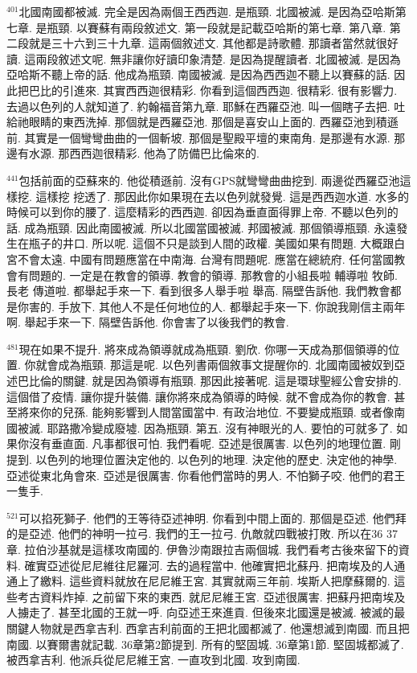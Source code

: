 \documentclass{book}
\begin{document}
$^{401}$北國南國都被滅.
完全是因為兩個王西西迦.
是瓶頸.
北國被滅.
是因為亞哈斯第七章.
是瓶頸.
以賽蘇有兩段敘述文.
第一段就是記載亞哈斯的第七章.
第八章.
第二段就是三十六到三十九章.
這兩個敘述文.
其他都是詩歌體.
那讀者當然就很好讀.
這兩段敘述文呢.
無非讓你好讀印象清楚.
是因為提醒讀者.
北國被滅.
是因為亞哈斯不聽上帝的話.
他成為瓶頸.
南國被滅.
是因為西西迦不聽上以賽蘇的話.
因此把巴比的引進來.
其實西西迦很精彩.
你看到這個西西迦.
很精彩.
很有影響力.
去過以色列的人就知道了.
約翰福音第九章.
耶穌在西羅亞池.
叫一個瞎子去把.
吐給祂眼睛的東西洗掉.
那個就是西羅亞池.
那個是喜安山上面的.
西羅亞池到積遜前.
其實是一個彎彎曲曲的一個斬坡.
那個是聖殿平壇的東南角.
是那邊有水源.
那邊有水源.
那西西迦很精彩.
他為了防備巴比倫來的.

$^{441}$包括前面的亞蘇來的.
他從積遜前.
沒有GPS就彎彎曲曲挖到.
兩邊從西羅亞池這樣挖.
這樣挖 挖透了.
那因此你如果現在去以色列就發覺.
這是西西迦水道.
水多的時候可以到你的腰了.
這麼精彩的西西迦.
卻因為垂直面得罪上帝.
不聽以色列的話.
成為瓶頸.
因此南國被滅.
所以北國當國被滅.
邦國被滅.
那個領導瓶頸.
永遠發生在瓶子的井口.
所以呢.
這個不只是談到人間的政權.
美國如果有問題.
大概跟白宮不會太遠.
中國有問題應當在中南海.
台灣有問題呢.
應當在總統府.
任何當國教會有問題的.
一定是在教會的領導.
教會的領導.
那教會的小組長啦 輔導啦 牧師.
長老 傳道啦.
都舉起手來一下.
看到很多人舉手啦 舉高.
隔壁告訴他.
我們教會都是你害的.
手放下.
其他人不是任何地位的人.
都舉起手來一下.
你說我剛信主兩年啊.
舉起手來一下.
隔壁告訴他.
你會害了以後我們的教會.

$^{481}$現在如果不提升.
將來成為領導就成為瓶頸.
劉欣.
你哪一天成為那個領導的位置.
你就會成為瓶頸.
那這是呢.
以色列書兩個敘事文提醒你的.
北國南國被奴到亞述巴比倫的關鍵.
就是因為領導有瓶頸.
那因此接著呢.
這是環球聖經公會安排的.
這個借了疫情.
讓你提升裝備.
讓你將來成為領導的時候.
就不會成為你的教會.
甚至將來你的兒孫.
能夠影響到人間當國當中.
有政治地位.
不要變成瓶頸.
或者像南國被滅.
耶路撒冷變成廢墟.
因為瓶頸.
第五.
沒有神眼光的人.
要怕的可就多了.
如果你沒有垂直面.
凡事都很可怕.
我們看呢.
亞述是很厲害.
以色列的地理位置.
剛提到.
以色列的地理位置決定他的.
以色列的地理.
決定他的歷史.
決定他的神學.
亞述從東北角會來.
亞述是很厲害.
你看他們當時的男人.
不怕獅子咬.
他們的君王一隻手.

$^{521}$可以掐死獅子.
他們的王等待亞述神明.
你看到中間上面的.
那個是亞述.
他們拜的是亞述.
他們的神明一拉弓.
我們的王一拉弓.
仇敵就四戰被打敗.
所以在36 37章.
拉伯沙基就是這樣攻南國的.
伊魯沙南跟拉吉兩個城.
我們看考古後來留下的資料.
確實亞述從尼尼維往尼羅河.
去的過程當中.
他確實把北蘇丹.
把南埃及的人通通上了繳料.
這些資料就放在尼尼維王宮.
其實就兩三年前.
埃斯人把摩蘇爾的.
這些考古資料炸掉.
之前留下來的東西.
就尼尼維王宮.
亞述很厲害.
把蘇丹把南埃及人擄走了.
甚至北國的王就一呼.
向亞述王來進貢.
但後來北國還是被滅.
被滅的最關鍵人物就是西拿吉利.
西拿吉利前面的王把北國都滅了.
他還想滅到南國.
而且把南國.
以賽爾書就記載.
36章第2節提到.
所有的堅固城.
36章第1節.
堅固城都滅了.
被西拿吉利.
他派兵從尼尼維王宮.
一直攻到北國.
攻到南國.
\end{document}
